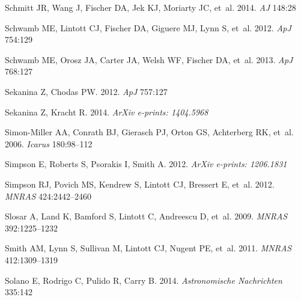 \documentclass{ar2e}
\def\apj{ApJ}
\def\mnras{MNRAS}
\def\aj{AJ}
\begin{document}
\begin{thebibliography}{}
{Schmitt} JR, {Wang} J, {Fischer} DA, {Jek} KJ, {Moriarty} JC, et~al. 2014.
\newblock \textit{\aj} 148:28

{Schwamb} ME, {Lintott} CJ, {Fischer} DA, {Giguere} MJ, {Lynn} S, et~al. 2012.
\newblock \textit{\apj} 754:129

{Schwamb} ME, {Orosz} JA, {Carter} JA, {Welsh} WF, {Fischer} DA, et~al. 2013.
\newblock \textit{\apj} 768:127

{Sekanina} Z, {Chodas} PW. 2012.
\newblock \textit{\apj} 757:127

{Sekanina} Z, {Kracht} R. 2014.
\newblock \textit{ArXiv e-prints: 1404.5968}

{Simon-Miller} AA, {Conrath} BJ, {Gierasch} PJ, {Orton} GS, {Achterberg} RK,
  et~al. 2006.
\newblock \textit{Icarus} 180:98--112

{Simpson} E, {Roberts} S, {Psorakis} I, {Smith} A. 2012.
\newblock \textit{ArXiv e-prints: 1206.1831}
  
{Simpson} RJ, {Povich} MS, {Kendrew} S, {Lintott} CJ, {Bressert} E, et~al.
  2012.
\newblock \textit{\mnras} 424:2442--2460

{Slosar} A, {Land} K, {Bamford} S, {Lintott} C, {Andreescu} D, et~al. 2009.
\newblock \textit{\mnras} 392:1225--1232

{Smith} AM, {Lynn} S, {Sullivan} M, {Lintott} CJ, {Nugent} PE, et~al. 2011.
\newblock \textit{\mnras} 412:1309--1319

{Solano} E, {Rodrigo} C, {Pulido} R, {Carry} B. 2014.
\newblock \textit{Astronomische Nachrichten} 335:142


\end{thebibliography}
\end{document}

